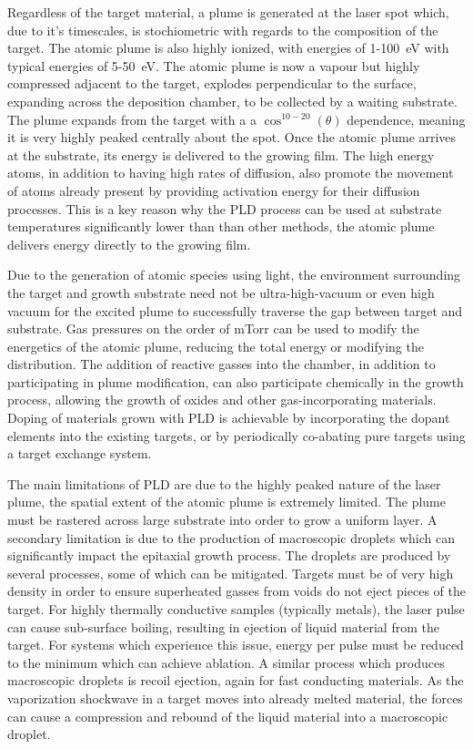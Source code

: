 Regardless of the target material, a plume is generated at the laser spot which, due to it's timescales, is stochiometric with regards to the composition of the target.
The atomic plume is also highly ionized, with energies of 1-100~eV with typical energies of 5-50~eV. The atomic plume is now a vapour but highly compressed adjacent to the target, explodes perpendicular to the surface, expanding across the deposition chamber, to be collected by a waiting substrate.
The plume expands from the target with a a \(\cos^{10-20}(\theta)\)
dependence, meaning it is very highly peaked centrally about the spot.
Once the atomic plume arrives at the substrate, its energy is delivered to the growing film.
The high energy atoms, in addition to having high rates of diffusion, also promote the movement of atoms already present by providing activation energy for their diffusion processes\cite{Willmott2000}.
This is a key reason why the PLD process can be used at substrate temperatures significantly lower than than other methods, the atomic plume delivers energy directly to the growing film.

Due to the generation of atomic species using light, the environment surrounding the target and growth substrate need not be ultra-high-vacuum or even high vacuum for the excited plume to successfully traverse the gap between target and substrate.
Gas pressures on the order of mTorr can be used to modify the energetics of the atomic plume, reducing the total energy or modifying the distribution\cite{Willmott2000}.
The addition of reactive gasses into the chamber, in addition to participating in plume modification, can also participate chemically in the growth process, allowing the growth of oxides and other gas-incorporating materials.
Doping of materials grown with PLD is achievable by incorporating the dopant elements into the existing targets, or by periodically co-abating pure targets using a target exchange system.

The main limitations of PLD are due to the highly peaked nature of the laser plume, the spatial extent of the atomic plume is extremely limited.
The plume must be rastered across large substrate into order to grow a uniform layer.
A secondary limitation is due to the production of macroscopic droplets which can significantly impact the epitaxial growth process.
The droplets are produced by several processes, some of which can be mitigated.
Targets must be of very high density in order to ensure superheated gasses from voids do not eject pieces of the target.
For highly thermally conductive samples (typically metals), the laser pulse can cause sub-surface boiling, resulting in ejection of liquid material from the target.
For systems which experience this issue, energy per pulse must be reduced to the minimum which can achieve ablation.
A similar process which produces macroscopic droplets is recoil ejection, again for fast conducting materials.
As the vaporization shockwave in a target moves into already melted material, the forces can cause a compression and rebound of the liquid material into a macroscopic droplet.

